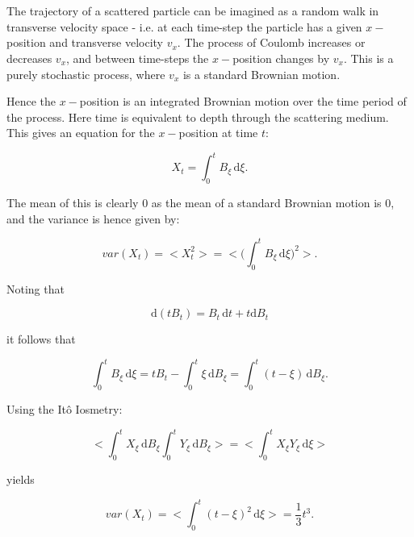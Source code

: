 \documentclass{article}
\numberwithin{equation}{section}
\newcommand{\dd}[1]{\mathrm{d}#1}
\begin{document}
\section{}
The trajectory of a scattered particle can be imagined as a random walk in transverse velocity space - i.e. at each time-step the particle has a given $x-$position and transverse velocity $v_x$. The process of Coulomb increases or decreases $v_x$, and between time-steps the $x-$position changes by $v_x$. This is a purely stochastic process, where $v_x$ is a standard Brownian motion.

Hence the $x-$position is an integrated Brownian motion over the time period of the process. Here time is equivalent to depth through the scattering medium. This gives an equation for the $x-$position at time $t$:

\begin{equation}
    X_t = \int_0^t B_\xi \, \dd\xi.
\end{equation}

The mean of this is clearly $0$ as the mean of a standard Brownian motion is $0$, and the variance is hence given by:

\begin{equation}
    var(X_t) = \big<X_t^2\big> = \bigg<\bigg(\int_0^t B_\xi \, \dd\xi\bigg)^2\bigg>.
\end{equation}

Noting that

\begin{equation}
    \dd(tB_t) = B_t\,\dd t + t\dd B_t
\end{equation}

it follows that

\begin{equation}
    \int_0^tB_\xi \, \dd \xi = tB_t - \int_0^t\xi \, \dd B_\xi = \int_0^t (t-\xi) \, \dd B_\xi.
\end{equation}

Using the Itô Iosmetry:

\begin{equation}
    \bigg< \int_0^t X_\xi \, \dd B_\xi  \int_0^t Y_\xi \, \dd B_\xi \bigg> = \bigg< \int_0^t X_\xi Y_\xi \, \dd\xi \bigg>
\end{equation}

yields

\begin{equation}
    var(X_t) =  \bigg< \int_0^t (t-\xi)^2 \, \dd \xi \bigg> = \frac{1}{3}t^3.
\end{equation}
\end{document}
